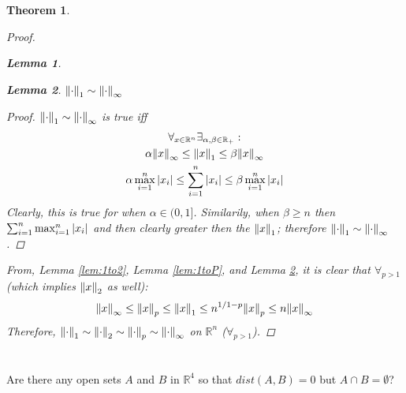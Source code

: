 \documentclass[]{article}
\newcommand{\R}{\mathbb{R}}
\newtheorem{theorem}{Theorem}
\newtheorem{lemma}{Lemma}
\begin{document}
\begin{theorem}
\begin{proof}
\begin{lemma}
        \end{lemma}
        \newpage
        \begin{lemma}\label{lem:1toInfty}
            $\norm{\cdot}_1 \sim \norm{\cdot}_\infty$
            \begin{proof}
                $\norm{\cdot}_1 \sim \norm{\cdot}_\infty$ is true iff
                \begin{multline*} 
                    \forall_{x \in \R^n} \exists_{\alpha,\beta \in \R_+} :\\
                    \alpha \norm{x}_\infty \leq \norm{x}_1 \leq \beta \norm{x}_\infty\\
                    \alpha \max_{i=1}^n \abs{x_i} \leq \sum_{i=1}^n \abs{x_i} \leq \beta \max_{i=1}^n \abs{x_i}\\
                \end{multline*}
                Clearly, this is true for when $\alpha \in (0,1]$. Similarily, when $\beta \geq n$ then $\sum_{i=1}^n \max_{i=1}^n \abs{x_i}$ and then clearly greater then the $\norm{x}_1$; therefore $\norm{\cdot}_1 \sim \norm{\cdot}_\infty$.
            \end{proof}
        \end{lemma}
        From, Lemma \ref{lem:1to2}, Lemma \ref{lem:1toP}, and Lemma \ref{lem:1toInfty}, it is clear that $\forall_{p > 1}$ (which implies $\norm{x}_2$ as well):
        \[
            \norm{x}_\infty 
            \leq \norm{x}_p 
            \leq \norm{x}_1 
            \leq n^{1/{1-p}} \norm{x}_p 
            \leq n \norm{x}_\infty
        \]
        Therefore, $\norm{\cdot}_1 \sim \norm{\cdot}_2 \sim \norm{\cdot}_p \sim \norm{\cdot}_\infty$ on $\R^n$ ($\forall_{p > 1}$).
    \end{proof}
\end{theorem}















\newpage
\section{}
Are there any open sets $A$ and $B$ in $\R^4$ so that $dist(A,B) = 0$ but $A \cap B = \emptyset$?
\end{document}
